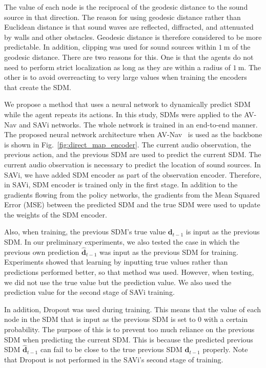 The value of each node is the reciprocal of the geodesic distance to the sound source in that direction.
The reason for using geodesic distance rather than Euclidean distance is that sound waves are reflected, diffracted, and attenuated by walls and other obstacles. Geodesic distance is therefore considered to be more predictable.
In addition, clipping was used for sound sources within $1\ \mathrm{m}$ of the geodesic distance.
There are two reasons for this. One is that the agents do not need to perform strict localization as long as they are within a radius of $1\ \mathrm{m}$.
The other is to avoid overreacting to very large values when training the encoders that create the SDM.

We propose a method that uses a neural network to dynamically predict SDM while the agent repeats its actions.
In this study, SDMs were applied to the AV-Nav \cite{chen2020soundspaces} and SAVi \cite{chen2021semantic} networks.
The whole network is trained in an end-to-end manner.
The proposed neural network architecture when AV-Nav~\cite{chen2020soundspaces} is used as the backbone is shown in Fig.~\ref{fig:direct_map_encoder}.
The current audio observation, the previous action, and the previous SDM are used to predict the current SDM. The current audio observation is necessary to predict the location of sound sources.
In SAVi, we have added SDM encoder as part of the observation encoder.
Therefore, in SAVi, SDM encoder is trained only in the first stage.
In addition to the gradients flowing from the policy networks, the gradients from the Mean Squared Error (MSE) between the predicted SDM and the true SDM were used to update the weights of the SDM encoder.

Also, when training, the previous SDM's true value $\boldsymbol{d}_{t-1}$ is input as the previous SDM.
In our preliminary experiments, we also tested the case in which the previous own prediction $\hat{\boldsymbol{d}}_{t-1}$ was input as the previous SDM for training.
Experiments showed that learning by inputting true values rather than predictions performed better, so that method was used.
However, when testing, we did not use the true value but the prediction value.
We also used the prediction value for the second stage of SAVi training.

In addition, Dropout was used during training.
This means that the value of each node in the SDM that is input as the previous SDM is set to 0 with a certain probability.
The purpose of this is to prevent too much reliance on the previous SDM when predicting the current SDM.
This is because the predicted previous SDM $\hat{\boldsymbol{d}}_{t-1}$ can fail to be close to the true previous SDM $\boldsymbol{d}_{t-1}$ properly.
Note that Dropout is not performed in the SAVi's second stage of training.


